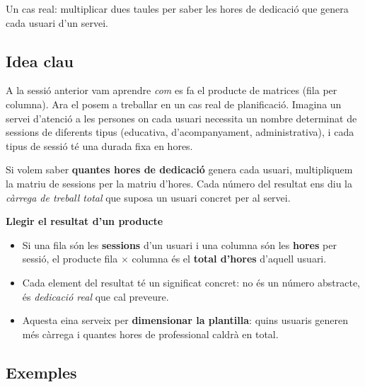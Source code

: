%
{Un cas real: multiplicar dues taules per saber les hores de dedicació que genera cada usuari d'un servei.}

\subsection{Idea clau}

A la sessió anterior vam aprendre \emph{com} es fa el producte de matrices (fila
per columna). Ara el posem a treballar en un cas real de planificació. Imagina un
servei d'atenció a les persones on cada usuari necessita un nombre determinat de
sessions de diferents tipus (educativa, d'acompanyament, administrativa), i cada
tipus de sessió té una durada fixa en hores.

Si volem saber \textbf{quantes hores de dedicació} genera cada usuari, multipliquem
la matriu de sessions per la matriu d'hores. Cada número del resultat ens diu la
\emph{càrrega de treball total} que suposa un usuari concret per al servei.

\begin{idea}
\textbf{Llegir el resultat d'un producte}
\begin{itemize}[leftmargin=1.4em, itemsep=2pt]
  \item Si una fila són les \textbf{sessions} d'un usuari i una columna són les
        \textbf{hores} per sessió, el producte fila $\times$ columna és el
        \textbf{total d'hores} d'aquell usuari.
  \item Cada element del resultat té un significat concret: no és un número
        abstracte, és \emph{dedicació real} que cal preveure.
  \item Aquesta eina serveix per \textbf{dimensionar la plantilla}: quins usuaris
        generen més càrrega i quantes hores de professional caldrà en total.
\end{itemize}
\end{idea}

\subsection{Exemples}

